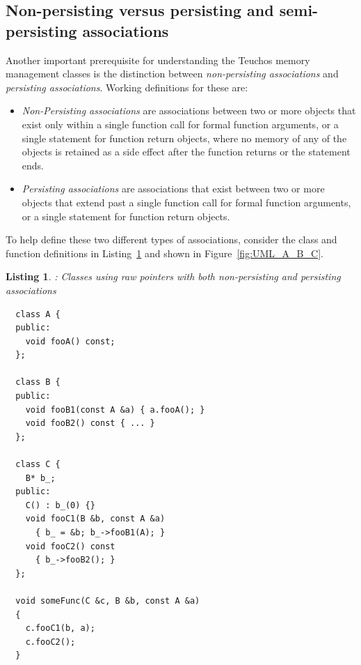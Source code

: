 \documentclass[pdf,ps2pdf,11pt]{SANDreport}
\newtheorem{listing}{Listing}
\begin{document}
%
{}\subsection{Non-persisting versus persisting and semi-persisting
associations}
\label{sec:nonpersisting-persisting-associations}
%

Another important prerequisite for understanding the Teuchos memory
management classes is the distinction between {}\textit{non-persisting
associations} and {}\textit{persisting associations}.  Working
definitions for these are:

\begin{itemize}

{}\item\textit{Non-Persisting associations} are associations between
two or more objects that exist only within a single function call for
formal function arguments, or a single statement for function return
objects, where no memory of any of the objects is retained as a side
effect after the function returns or the statement ends.

{}\item\textit{Persisting associations} are associations that exist
between two or more objects that extend past a single function call
for formal function arguments, or a single statement for function
return objects.

\end{itemize}

To help define these two different types of associations, consider the
class and function definitions in
Listing~\ref{listing:NonPersistingPersistingAssociationsRawPointers}
and shown in Figure~\ref{fig:UML_A_B_C}.


{}\begin{listing}: Classes using raw pointers with both non-persisting
and persisting associations
\label{listing:NonPersistingPersistingAssociationsRawPointers}
{\small\begin{verbatim}
  class A {
  public:
    void fooA() const;
  };

  class B {
  public:
    void fooB1(const A &a) { a.fooA(); }
    void fooB2() const { ... }
  };

  class C {
    B* b_;    
  public:
    C() : b_(0) {}
    void fooC1(B &b, const A &a)
      { b_ = &b; b_->fooB1(A); }
    void fooC2() const
      { b_->fooB2(); }
  };

  void someFunc(C &c, B &b, const A &a)
  {
    c.fooC1(b, a);
    c.fooC2();
  }
\end{verbatim}}
\end{listing}
\end{document}
